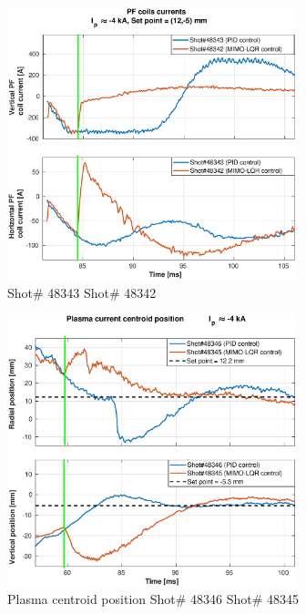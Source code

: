 \begin{figure}
	\centering
	\includegraphics[width=0.75\textwidth]{Chp5/PIDvsMIMO_343_342_curr_2.eps}
	\caption{ Shot\# 48343 Shot\# 48342}
\end{figure}

\begin{figure}
	\centering
	\includegraphics[width=0.75\textwidth]{Chp5/PIDvsMIMO_346_345_2.eps}
	\caption{Plasma centroid position Shot\# 48346 Shot\# 48345}
\end{figure}

